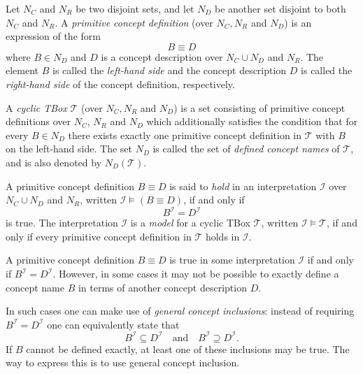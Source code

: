 \begin{Definition}
  \label{def:primitive-concept-definitions-cyclic-TBoxes}
  Let $N_C$ and $N_R$ be two disjoint sets, and let $N_D$ be another set disjoint to both
  $N_C$ and $N_R$.  A \emph{primitive concept definition} (over $N_C, N_R$ and $N_D$) is
  an expression of the form
  \begin{equation*}
    B \equiv D
  \end{equation*}
  where $B \in N_D$ and $D$ is a concept description over $N_C \cup N_D$ and $N_R$.  The
  element $B$ is called the \emph{left-hand side} and the concept description $D$ is
  called the \emph{right-hand side} of the concept definition, respectively.

  A \emph{cyclic TBox} $\mathcal{T}$ (over $N_C, N_R$ and $N_D$) is a set consisting of
  primitive concept definitions over $N_C$, $N_R$ and $N_D$ which additionally satisfies
  the condition that for every $B \in N_D$ there exists exactly one primitive concept
  definition in $\mathcal{T}$ with $B$ on the left-hand side.  The set $N_D$ is called the
  set of \emph{defined concept names} of $\mathcal{T}$, and is also denoted by
  $N_D(\mathcal{T})$.

  A primitive concept definition $B \equiv D$ is said to \emph{hold} in an interpretation
  $\mathcal{I}$ over $N_C \cup N_D$ and $N_R$, written $\mathcal{I} \models (B \equiv D)$,
  if and only if
  \begin{equation*}
    B^{\mathcal{I}} = D^{\mathcal{I}}
  \end{equation*}
  is true.  The interpretation $\mathcal{I}$ is a \emph{model} for a cyclic TBox
  $\mathcal{T}$, written $\mathcal{I} \models \mathcal{T}$, if and only if every primitive
  concept definition in $\mathcal{T}$ holds in $\mathcal{I}$.
\end{Definition}

A primitive concept definition $B \equiv D$ is true in some interpretation $\mathcal{I}$
if and only if $B^{\mathcal{I}} = D^{\mathcal{I}}$.  However, in some cases it may not be
possible to exactly define a concept name $B$ in terms of another concept description
$D$.

In such cases one can make use of \emph{general concept inclusions}: instead of requiring
$B^{\mathcal{I}} = D^{\mathcal{I}}$ one can equivalently state that
\begin{equation*}
  B^{\mathcal{I}} \subseteq D^{\mathcal{I}} \quad\text{and}\quad B^{\mathcal{I}} \supseteq D^{\mathcal{I}}.
\end{equation*}
If $B$ cannot be defined exactly, at least one of these inclusions may be true.  The way
to express this is to use general concept inclusion.

